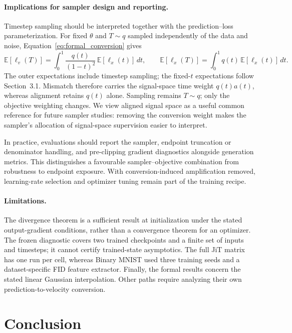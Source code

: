\documentclass{article}
\theoremstyle{plain}
\theoremstyle{definition}
\theoremstyle{remark}
\newcommand{\Ex}{\mathbb{E}}
\begin{document}
\paragraph{Implications for sampler design and reporting.}
Timestep sampling should be interpreted together with the prediction--loss parameterization. For fixed $\theta$ and $T\sim q$ sampled independently of the data and noise, Equation~\eqref{eq:formal_conversion} gives
\begin{equation}
\Ex[\ell_v(T)]=\int_0^1 \frac{q(t)}{(1-t)^2}\,\Ex[\ell_x(t)]\,dt,
\qquad
\Ex[\ell_x(T)]=\int_0^1 q(t)\,\Ex[\ell_x(t)]\,dt.
\label{eq:discussion_time_weight}
\end{equation}
The outer expectations include timestep sampling; the fixed-$t$ expectations follow Section~3.1. Mismatch therefore carries the signal-space time weight $q(t)a(t)$, whereas alignment retains $q(t)$ alone. Sampling remains $T\sim q$; only the objective weighting changes. We view aligned signal space as a useful common reference for future sampler studies: removing the conversion weight makes the sampler's allocation of signal-space supervision easier to interpret.

In practice, evaluations should report the sampler, endpoint truncation or denominator handling, and pre-clipping gradient diagnostics alongside generation metrics. This distinguishes a favourable sampler--objective combination from robustness to endpoint exposure. With conversion-induced amplification removed, learning-rate selection and optimizer tuning remain part of the training recipe.

\paragraph{Limitations.}
The divergence theorem is a sufficient result at initialization under the stated output-gradient conditions, rather than a convergence theorem for an optimizer. The frozen diagnostic covers two trained checkpoints and a finite set of inputs and timesteps; it cannot certify trained-state asymptotics. The full JiT matrix has one run per cell, whereas Binary MNIST used three training seeds and a dataset-specific FID feature extractor. Finally, the formal results concern the stated linear Gaussian interpolation. Other paths require analyzing their own prediction-to-velocity conversion.

\section{Conclusion}
\end{document}
